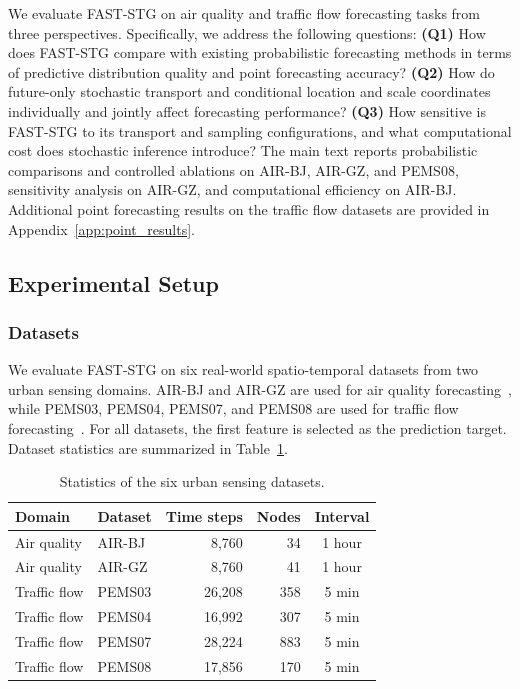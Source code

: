 \documentclass[sigconf, anonymous, review]{acmart}
\begin{document}
We evaluate FAST-STG on air quality and traffic flow forecasting tasks
from three perspectives. Specifically, we address the following
questions: \textbf{(Q1)} How does FAST-STG compare with existing
probabilistic forecasting methods in terms of predictive distribution
quality and point forecasting accuracy? \textbf{(Q2)} How do
future-only stochastic transport and conditional location and scale
coordinates individually and jointly affect forecasting performance?
\textbf{(Q3)} How sensitive is FAST-STG to its transport and sampling
configurations, and what computational cost does stochastic inference
introduce? The main text reports probabilistic comparisons and
controlled ablations on AIR-BJ, AIR-GZ, and PEMS08, sensitivity
analysis on AIR-GZ, and computational efficiency on AIR-BJ. Additional
point forecasting results on the traffic flow datasets are provided in
Appendix~\ref{app:point_results}.

\subsection{Experimental Setup}
\label{sec:experimental_setup}

\subsubsection{Datasets}

We evaluate FAST-STG on six real-world spatio-temporal datasets from
two urban sensing domains. AIR-BJ and AIR-GZ are used for air quality
forecasting~\cite{wen2023diffstg}, while PEMS03, PEMS04, PEMS07, and
PEMS08 are used for traffic flow forecasting~\cite{zhang2026msthg}.
For all datasets, the first feature is selected as the prediction
target. Dataset statistics are summarized in
Table~\ref{tab:dataset_statistics}.

\begin{table}[h]
    \centering
    \caption{Statistics of the six urban sensing datasets.}
    \label{tab:dataset_statistics}
    \small
    \setlength{\tabcolsep}{5pt}
    \begin{tabular}{@{}llrrc@{}}
        \toprule
        Domain & Dataset & Time steps & Nodes & Interval \\
        \midrule
        Air quality  & AIR-BJ  & 8,760  & 34  & 1 hour \\
        Air quality  & AIR-GZ  & 8,760  & 41  & 1 hour \\
        Traffic flow & PEMS03  & 26,208 & 358 & 5 min  \\
        Traffic flow & PEMS04  & 16,992 & 307 & 5 min  \\
        Traffic flow & PEMS07  & 28,224 & 883 & 5 min  \\
        Traffic flow & PEMS08  & 17,856 & 170 & 5 min  \\
        \bottomrule
    \end{tabular}
\end{table}
\end{document}
